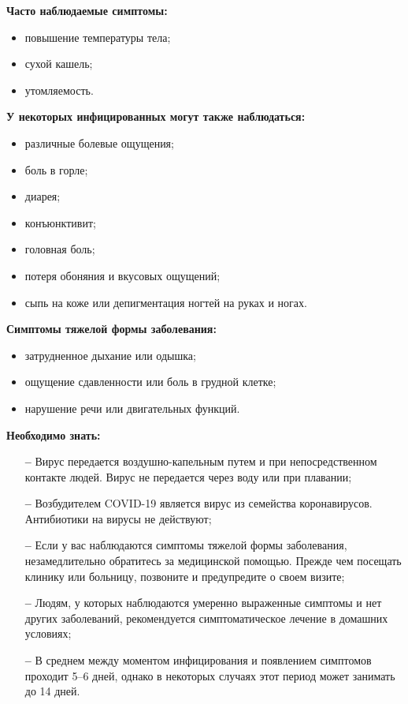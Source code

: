 \documentclass[a4paper, 12pt]{extarticle}
\begin{document}
\textbf{Часто наблюдаемые симптомы:}
\begin{itemize}
    \item повышение температуры тела;
    \item сухой кашель;
    \item утомляемость.
\end{itemize}

\vspace{5mm}

\textbf{У некоторых инфицированных могут также наблюдаться:}
\begin{itemize}
    \item различные болевые ощущения;
    \item боль в горле;
    \item диарея;
    \item конъюнктивит;
    \item головная боль;
    \item потеря обоняния и вкусовых ощущений;
    \item сыпь на коже или депигментация ногтей на руках и ногах.
\end{itemize}

\vspace{5mm}

\textbf{Симптомы тяжелой формы заболевания:}
\begin{itemize}
    \item затрудненное дыхание или одышка;
    \item ощущение сдавленности или боль в грудной клетке;
    \item нарушение речи или двигательных функций.
\end{itemize}

\vspace{5mm}

\textbf{Необходимо знать:}
\begin{itemize}
    \item[\bfseries--] Вирус передается воздушно-капельным путем и при непосредственном
        контакте людей. Вирус не передается через воду или при плавании;
    \item[\bfseries--] Возбудителем COVID-19 является вирус из семейства коронавирусов.
        Антибиотики на вирусы не действуют;
    \item[\bfseries--] Если у вас наблюдаются симптомы тяжелой формы заболевания,
        незамедлительно обратитесь за медицинской помощью. Прежде чем посещать
        клинику или больницу, позвоните и предупредите о своем визите;
    \item[\bfseries--] Людям, у которых наблюдаются умеренно выраженные симптомы и нет
        других заболеваний, рекомендуется симптоматическое лечение в домашних
        условиях;
    \item[\bfseries--] В среднем между моментом инфицирования и появлением симптомов
        проходит 5–6 дней, однако в некоторых случаях этот период может
        занимать до 14 дней.
\end{itemize}
\newpage
\end{document}
